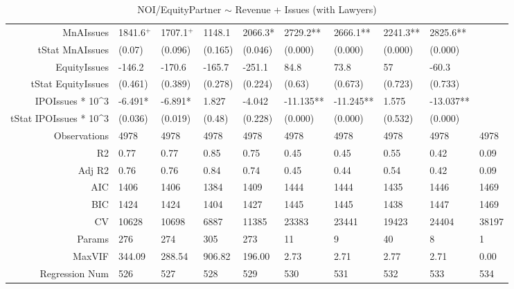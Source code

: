 \begin{table}[ht]
\begin{tabular}{rlllllllll}
  MnAIssues & 1841.6$^{+}$ & 1707.1$^{+}$ & 1148.1 & 2066.3* & 2729.2** & 2666.1** & 2241.3** & 2825.6** &  \\ 
  tStat MnAIssues & (0.07) & (0.096) & (0.165) & (0.046) & (0.000) & (0.000) & (0.000) & (0.000) &  \\ 
  EquityIssues & -146.2 & -170.6 & -165.7 & -251.1 & 84.8 & 73.8 & 57 & -60.3 &  \\ 
  tStat EquityIssues & (0.461) & (0.389) & (0.278) & (0.224) & (0.63) & (0.673) & (0.723) & (0.733) &  \\ 
  IPOIssues * 10^3 & -6.491* & -6.891* & 1.827 & -4.042 & -11.135** & -11.245** & 1.575 & -13.037** &  \\ 
  tStat IPOIssues * 10^3 & (0.036) & (0.019) & (0.48) & (0.228) & (0.000) & (0.000) & (0.532) & (0.000) &  \\ 
  Observations & 4978 & 4978 & 4978 & 4978 & 4978 & 4978 & 4978 & 4978 & 4978 \\ 
  R2 & 0.77 & 0.77 & 0.85 & 0.75 & 0.45 & 0.45 & 0.55 & 0.42 & 0.09 \\ 
  Adj R2 & 0.76 & 0.76 & 0.84 & 0.74 & 0.45 & 0.44 & 0.54 & 0.42 & 0.09 \\ 
  AIC & 1406 & 1406 & 1384 & 1409 & 1444 & 1444 & 1435 & 1446 & 1469 \\ 
  BIC & 1424 & 1424 & 1404 & 1427 & 1445 & 1445 & 1438 & 1447 & 1469 \\ 
  CV & 10628 & 10698 & 6887 & 11385 & 23383 & 23441 & 19423 & 24404 & 38197 \\ 
  Params & 276 & 274 & 305 & 273 & 11 & 9 & 40 & 8 & 1 \\ 
  MaxVIF & 344.09 & 288.54 & 906.82 & 196.00 & 2.73 & 2.71 & 2.77 & 2.71 & 0.00 \\ 
  Regression Num & 526 & 527 & 528 & 529 & 530 & 531 & 532 & 533 & 534 \\ 
   \hline
\end{tabular}
\caption{NOI/EquityPartner $\sim$ Revenue + Issues (with Lawyers)} 
\end{table}
